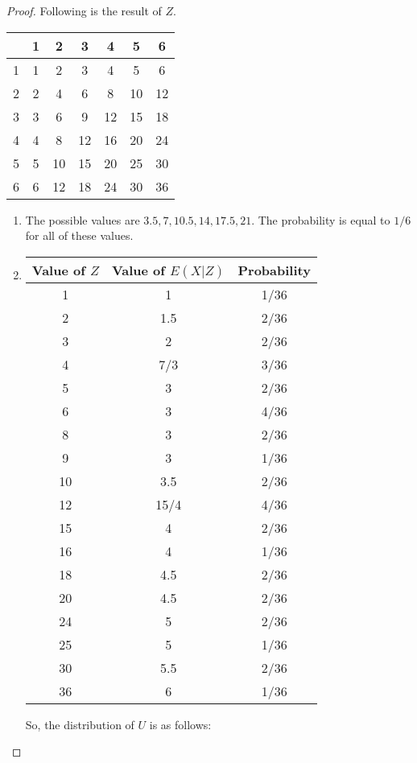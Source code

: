 \documentclass[a4paper]{article}\usepackage{amsmath,amssymb,amsthm,tikz,hyperref,mathtools,mathrsfs}
\begin{document}
\begin{proof}
  Following is the result of $Z$.

  \begin{tabular}{c|c c c c c c }
    & 1 & 2 & 3 & 4 & 5 & 6 \\
    \hline
    1 & 1 & 2 & 3 & 4 & 5 & 6 \\
    2 & 2 & 4 & 6 & 8 & 10 & 12 \\
    3 & 3 & 6 & 9 & 12 & 15 & 18 \\
    4 & 4 & 8 & 12 & 16 & 20 & 24 \\
    5 & 5 & 10 & 15 & 20 & 25 & 30 \\
    6 & 6 & 12 & 18 & 24 & 30 & 36
  \end{tabular}
  
  \begin{enumerate}
    \item The possible values are $3.5, 7, 10.5, 14, 17.5, 21$. The probability is equal to $1/6$ for all of these values.
    \item 
    \begin{tabular}{c | c | c}
      Value of $Z$ & Value of $E(X | Z)$ & Probability
      \\
      \hline
      1 & 1 & 1/36
      \\
      2 & 1.5 & 2/36
      \\
      3 & 2 & 2/36
      \\
      4 & 7/3 & 3/36
      \\
      5 & 3 & 2/36
      \\
      6 & 3 & 4/36 
      \\
      8 & 3 & 2/36 
      \\
      9 & 3 & 1/36 
      \\
      10 & 3.5 & 2/36
      \\
      12 & 15/4& 4/36 
      \\
      15 & 4 & 2/36
      \\
      16 & 4 & 1/36
      \\
      18 & 4.5 & 2/36 
      \\
      20 & 4.5 & 2/36 
      \\
      24 & 5 & 2/36 
      \\
      25 & 5 & 1/36
      \\
      30 & 5.5 & 2/36
      \\
      36 & 6 & 1/36
    \end{tabular}
    So, the distribution of $U$ is as follows:


\end{enumerate}
\end{proof}
\end{document}
